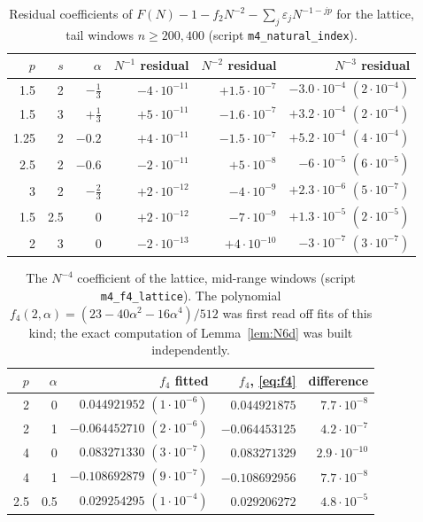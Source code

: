 \begin{table}[ht]
\centering
\small
\begin{tabular}{rrrrrr}
\toprule
$p$ & $s$ & $\alpha$ & $N^{-1}$ residual & $N^{-2}$ residual & $N^{-3}$ residual\\
\midrule
1.5 & 2 & $-\frac13$ & $-4\cdot10^{-11}$ & $+1.5\cdot10^{-7}$ & $-3.0\cdot10^{-4}$ $(2\cdot10^{-4})$\\
1.5 & 3 & $+\frac13$ & $+5\cdot10^{-11}$ & $-1.6\cdot10^{-7}$ & $+3.2\cdot10^{-4}$ $(2\cdot10^{-4})$\\
1.25 & 2 & $-0.2$ & $+4\cdot10^{-11}$ & $-1.5\cdot10^{-7}$ & $+5.2\cdot10^{-4}$ $(4\cdot10^{-4})$\\
2.5 & 2 & $-0.6$ & $-2\cdot10^{-11}$ & $+5\cdot10^{-8}$ & $-6\cdot10^{-5}$ $(6\cdot10^{-5})$\\
3 & 2 & $-\frac23$ & $+2\cdot10^{-12}$ & $-4\cdot10^{-9}$ & $+2.3\cdot10^{-6}$ $(5\cdot10^{-7})$\\
1.5 & 2.5 & $0$ & $+2\cdot10^{-12}$ & $-7\cdot10^{-9}$ & $+1.3\cdot10^{-5}$ $(2\cdot10^{-5})$\\
2 & 3 & $0$ & $-2\cdot10^{-13}$ & $+4\cdot10^{-10}$ & $-3\cdot10^{-7}$ $(3\cdot10^{-7})$\\
\bottomrule
\end{tabular}
\caption{Residual coefficients of $F(N)-1-f_2N^{-2}-\sum_j\varepsilon_jN^{-1-jp}$ for the lattice, tail windows
$n\ge200,400$ (script \texttt{m4\_natural\_index}).}
\label{tab:natural}
\end{table}

\begin{table}[ht]
\centering
\small
\begin{tabular}{rrrrr}
\toprule
$p$ & $\alpha$ & $f_4$ fitted & $f_4$, \eqref{eq:f4} & difference\\
\midrule
2 & 0 & $0.044921952$ $(1\cdot10^{-6})$ & $0.044921875$ & $7.7\cdot10^{-8}$\\
2 & 1 & $-0.064452710$ $(2\cdot10^{-6})$ & $-0.064453125$ & $4.2\cdot10^{-7}$\\
4 & 0 & $0.083271330$ $(3\cdot10^{-7})$ & $0.083271329$ & $2.9\cdot10^{-10}$\\
4 & 1 & $-0.108692879$ $(9\cdot10^{-7})$ & $-0.108692956$ & $7.7\cdot10^{-8}$\\
2.5 & 0.5 & $0.029254295$ $(1\cdot10^{-4})$ & $0.029206272$ & $4.8\cdot10^{-5}$\\
\bottomrule
\end{tabular}
\caption{The $N^{-4}$ coefficient of the lattice, mid-range windows (script \texttt{m4\_f4\_lattice}). The polynomial
$f_4(2,\alpha)=(23-40\alpha^2-16\alpha^4)/512$ was first read off fits of this kind; the exact computation of
Lemma~\ref{lem:N6d} was built independently.}
\label{tab:f4}
\end{table}

